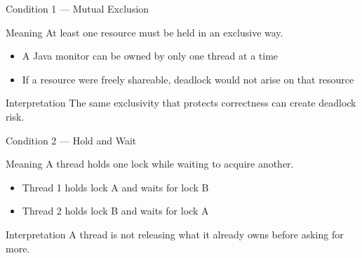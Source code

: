 \documentclass[aspectratio=169,11pt]{beamer}
\begin{document}
	\begin{frame}{Condition 1 --- Mutual Exclusion}
		\begin{block}{Meaning}
			At least one resource must be held in an exclusive way.
		\end{block}
		
		\bigskip
		
		\begin{itemize}
			\item A Java monitor can be owned by only one thread at a time
			\item If a resource were freely shareable, deadlock would not arise on that resource
		\end{itemize}
		
		\bigskip
		
		\begin{alertblock}{Interpretation}
			The same exclusivity that protects correctness can create deadlock risk.
		\end{alertblock}
	\end{frame}
	
	\begin{frame}{Condition 2 --- Hold and Wait}
		\begin{block}{Meaning}
			A thread holds one lock while waiting to acquire another.
		\end{block}
		
		\bigskip
		
		\begin{itemize}
			\item Thread 1 holds lock A and waits for lock B
			\item Thread 2 holds lock B and waits for lock A
		\end{itemize}
		
		\bigskip
		
		\begin{alertblock}{Interpretation}
			A thread is not releasing what it already owns before asking for more.
		\end{alertblock}
	\end{frame}
	
\end{document}
